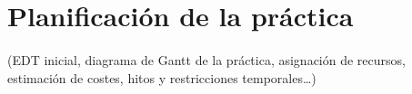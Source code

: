 \section{Planificación de la práctica}
\paragraph*{}
(EDT inicial, diagrama de Gantt de la práctica, asignación de recursos, estimación de costes, hitos y restricciones temporales…)
